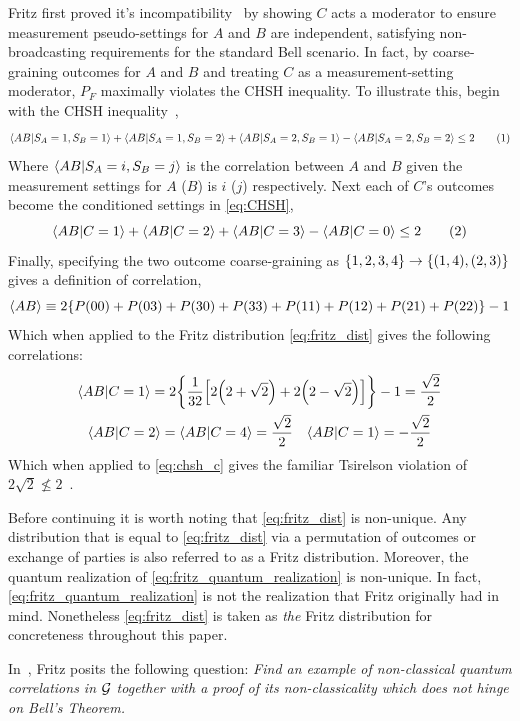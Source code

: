 \documentclass[aps, 10pt, english, twoside, pra, nofootinbib, longbibliography]{revtex4-1}
\begin{document}
    Fritz first proved it's incompatibility~\cite{Fritz_2012} by showing $C$ acts a moderator to ensure measurement pseudo-settings for $A$ and $B$ are independent, satisfying non-broadcasting requirements for the standard Bell scenario. In fact, by coarse-graining outcomes for $A$ and $B$ and treating $C$ as a measurement-setting moderator, $P_F$ maximally violates the CHSH inequality. To illustrate this, begin with the CHSH inequality~\cite{CHSH_Original},
    \[ \ba{AB|S_A=1, S_B=1} + \ba{AB|S_A=1, S_B=2} + \ba{AB|S_A=2, S_B=1} - \ba{AB|S_A=2, S_B=2} \leq 2 \eq \label{eq:CHSH}\]
    Where $\ba{AB|S_A=i, S_B=j}$ is the correlation between $A$ and $B$ given the measurement settings for $A$ ($B$) is $i$ ($j$) respectively. Next each of $C$'s outcomes become the conditioned settings in \cref{eq:CHSH},
    \[ \ba{AB|C=1} + \ba{AB|C=2} + \ba{AB|C=3} - \ba{AB|C=0} \leq 2 \eq \label{eq:chsh_c}\]
    Finally, specifying the two outcome coarse-graining as $\bc{1,2,3,4} \rightarrow \bc{\br{1,4}, \br{2,3}}$ gives a definition of correlation,
    \[ \ba{AB} \defined 2\bc{\prob[][00] + \prob[][03] + \prob[][30] + \prob[][33] + \prob[][11] + \prob[][12] + \prob[][21] + \prob[][22]} - 1 \]
    Which when applied to the Fritz distribution \cref{eq:fritz_dist} gives the following correlations:
    \begin{gather*}
    \ba{AB|C=1} = 2 \bc{\f{1}{32}\bs{2\br{2+\sqrt{2}}+2\br{2-\sqrt{2}}}} - 1 = \f{\sqrt{2}}{2} \\
    \ba{AB|C=2} = \ba{AB|C=4} = \f{\sqrt{2}}{2} \quad \ba{AB|C=1} = -\f{\sqrt{2}}{2}
    \end{gather*}
    Which when applied to \cref{eq:chsh_c} gives the familiar Tsirelson violation of $2\sqrt{2} \not\leq 2$~\cite{Cirelson_1980}.

    Before continuing it is worth noting that \cref{eq:fritz_dist} is non-unique. Any distribution that is equal to \cref{eq:fritz_dist} via a permutation of outcomes or exchange of parties is also referred to as a Fritz distribution. Moreover, the quantum realization of \cref{eq:fritz_quantum_realization} is non-unique. In fact, \cref{eq:fritz_quantum_realization} is not the realization that Fritz originally had in mind. Nonetheless \cref{eq:fritz_dist} is taken as \textit{the} Fritz distribution for concreteness throughout this paper.

    In~\cite{Fritz_2012}, Fritz posits the following question: \textit{Find an example of non-classical quantum correlations in ${\mathcal{G}}$ together with a proof of its non-classicality which does not hinge on Bell’s Theorem.}
\end{document}
